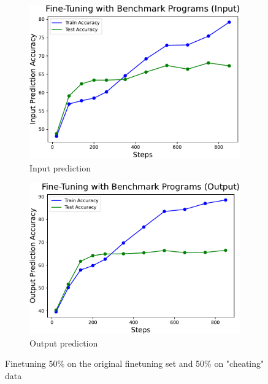 \begin{figure}[H]
     \centering
     \begin{subfigure}[b]{0.48\textwidth}
         \centering
         \includegraphics[scale=0.4]{figs/finetuning/finetuning_input_moredata_accuracy.pdf}
         \caption{Input prediction}
         \label{fig:finetuning-accuracy-samples-plot-input}
     \end{subfigure}
     \hfill
     \begin{subfigure}[b]{0.48\textwidth}
         \centering
         \includegraphics[scale=0.4]{figs/finetuning/finetuning_output_moredata_accuracy.pdf}
         \caption{Output prediction}
         \label{fig:finetuning-accuracy-samples-plot-output}
     \end{subfigure}
     \caption{Finetuning 50\% on the original finetuning set and 50\% on "cheating" data}
     \label{fig:finetuning-accuracy-samples-plot}
\end{figure}